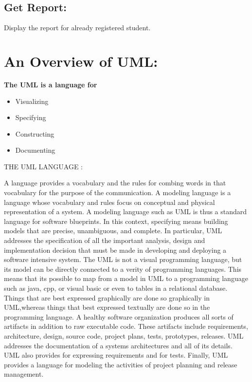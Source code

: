 \subsection{Get Report: }
Display the report for already registered student.

\section{An Overview of  UML: }
{\bfseries The UML is a language for}
\begin{itemize}
\item Visualizing 
\item Specifying
\item Constructing 
\item Documenting 
\end{itemize}

THE UML LANGUAGE :

A language provides a vocabulary and the rules for combing words in that vocabulary for the purpose of the communication. A modeling language is a language whose vocabulary and rules focus on conceptual and physical representation of a system. A modeling language such as UML is thus a standard language for software blueprints.
In this context, specifying means building models that are precise, unambiguous, and complete. In particular, UML addresses the specification of all the important analysis, design and implementation decision that must be made in developing and deploying a software intensive system.
The UML is not a visual programming language, but its model can be directly connected to a verity of programming languages. This means that its possible to map from a model in UML to a programming language such as java, cpp, or visual basic or even to tables in a relational database. Things that are best expressed graphically are done so graphically in UML,whereas things that best expressed textually are done so in the programming language.
A healthy software organization produces all sorts of artifacts in addition to raw executable code. These artifacts include requirements, architecture, design, source code, project plans, tests, prototypes, releases. UML addresses the documentation of a systems architectures and all of its details. UML also provides for expressing requirements and for tests. Finally, UML provides a language for modeling the activities of project planning and release management.

